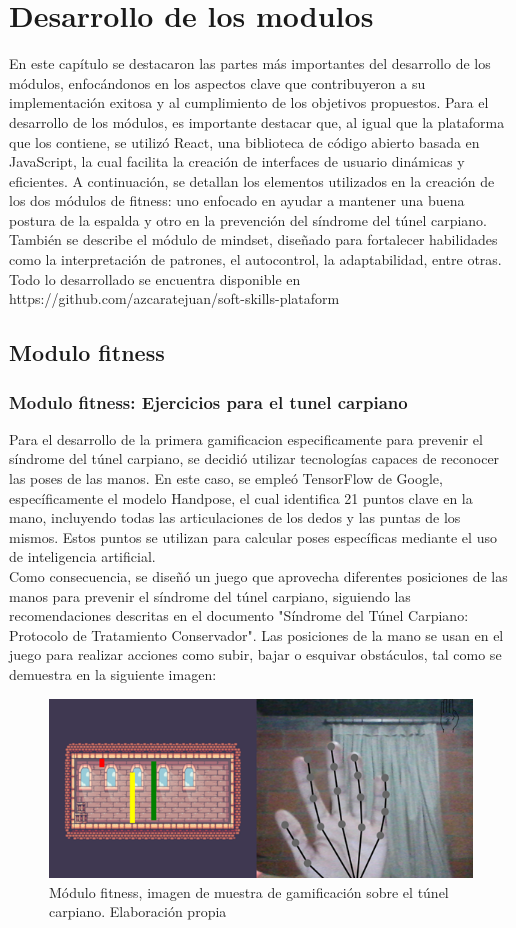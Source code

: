 
\section{Desarrollo de los modulos}
En este capítulo se destacaron las partes más importantes del desarrollo de los módulos, enfocándonos en los aspectos clave que contribuyeron a su implementación exitosa y al cumplimiento de los objetivos propuestos.
Para el desarrollo de los módulos, es importante destacar que, al igual que la plataforma que los contiene, se utilizó React, una biblioteca de código abierto basada en JavaScript, la cual facilita la creación de interfaces de usuario dinámicas y eficientes. A continuación, se detallan los elementos utilizados en la creación de los dos módulos de fitness: uno enfocado en ayudar a mantener una buena postura de la espalda y otro en la prevención del síndrome del túnel carpiano. También se describe el módulo de mindset, diseñado para fortalecer habilidades como la interpretación de patrones, el autocontrol, la adaptabilidad, entre otras. Todo lo desarrollado se encuentra disponible en https://github.com/azcaratejuan/soft-skills-plataform \subsection{Modulo fitness}
\subsubsection{Modulo fitness: Ejercicios para el tunel carpiano}
Para el desarrollo de la primera gamificacion especificamente para prevenir el síndrome del túnel carpiano, se decidió utilizar tecnologías capaces de reconocer las poses de las manos. En este caso, se empleó TensorFlow de Google, específicamente el modelo Handpose, el cual identifica 21 puntos clave en la mano, incluyendo todas las articulaciones de los dedos y las puntas de los mismos. Estos puntos se utilizan para calcular poses específicas mediante el uso de inteligencia artificial.
\\
Como consecuencia, se diseñó un juego que aprovecha diferentes posiciones de las manos para prevenir el síndrome del túnel carpiano, siguiendo las recomendaciones descritas en el documento "Síndrome del Túnel Carpiano: Protocolo de Tratamiento Conservador"\cite{14_1}. Las posiciones de la mano se usan en el juego para realizar acciones como subir, bajar o esquivar obstáculos, tal como se demuestra en la siguiente imagen:
\begin{figure}[H]
  \centering
  \includegraphics[width=0.6\linewidth]{Imagenes/Fitness1.png}
  \caption{Módulo fitness, imagen de muestra de gamificación sobre el túnel carpiano. Elaboración propia}
  \label{fig:imagen1fitness}
\end{figure}



